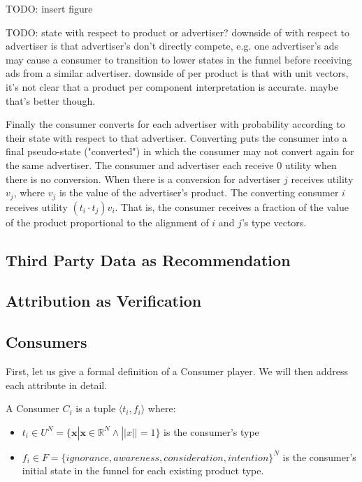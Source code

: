 \documentclass{article}
\begin{document}
TODO: insert figure

TODO: state with respect to product or advertiser? downside of with respect to advertiser is that advertiser's don't directly compete, e.g. one advertiser's ads may cause a consumer to transition to lower states in the funnel before receiving ads from a similar advertiser. downside of per product is that with unit vectors, it's not clear that a product per component interpretation is accurate. maybe that's better though.

Finally the consumer converts for each advertiser with probability according to their state with respect to that advertiser. Converting puts the consumer into a final pseudo-state ("converted") in which the consumer may not convert again for the same advertiser. The consumer and advertiser each receive 0 utility when there is no conversion. When there is a conversion for advertiser $j$ receives utility $v_j$, where $v_j$ is the value of the advertiser's product. The converting consumer $i$ receives utility $(t_i \cdot t_j) v_i$. That is, the consumer receives a fraction of the value of the product proportional to the alignment of $i$ and $j$'s type vectors.



\subsection{Third Party Data as Recommendation}

\subsection{Attribution as Verification}

\subsection{Consumers}

First, let us give a formal definition of a Consumer player. We will then address each attribute in detail.

A Consumer $C_i$ is a tuple $\langle t_i, f_i \rangle$ where:

\begin{itemize}
	\item $t_i \in U^N = \{\bm{x} | \bm{x} \in \mathbb{R}^N \wedge ||x|| = 1\}$ is the consumer's type
	\item $f_i \in F = \{ignorance, awareness, consideration, intention\}^N$ is the consumer's initial state in the funnel for each existing product type. 
\end{itemize}
\end{document}
